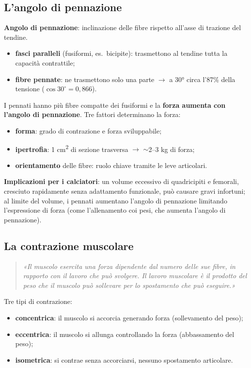\subsection{L'angolo di pennazione}
\textbf{Angolo di pennazione}: inclinazione delle fibre rispetto all'asse di trazione del tendine.
\begin{itemize}
  \item \textbf{fasci paralleli} (fusiformi, es.\ bicipite): trasmettono al tendine tutta la
    capacità contrattile;
  \item \textbf{fibre pennate}: ne trasmettono solo una parte $\rightarrow$ a 30° circa l'87\%
    della tensione ($\cos 30^\circ = 0{,}866$).
\end{itemize}
I pennati hanno più fibre compatte dei fusiformi e la \textbf{forza aumenta con l'angolo di
pennazione}. Tre fattori determinano la forza:
\begin{itemize}
  \item \textbf{forma}: grado di contrazione e forza sviluppabile;
  \item \textbf{ipertrofia}: 1 cm\textsuperscript{2} di sezione trasversa $\rightarrow$ $\sim$2--3
    kg di forza;
  \item \textbf{orientamento} delle fibre: ruolo chiave tramite le leve articolari.
\end{itemize}
\textbf{Implicazioni per i calciatori}: un volume eccessivo di quadricipiti e femorali, cresciuto
rapidamente senza adattamento funzionale, può causare gravi infortuni; al limite del volume, i
pennati aumentano l'angolo di pennazione limitando l'espressione di forza (come l'allenamento coi
pesi, che aumenta l'angolo di pennazione).

\subsection{La contrazione muscolare}
\begin{quote}
\textit{«Il muscolo esercita una forza dipendente dal numero delle sue fibre, in rapporto con il
lavoro che può svolgere. Il lavoro muscolare è il prodotto del peso che il muscolo può sollevare
per lo spostamento che può eseguire.»}
\end{quote}
Tre tipi di contrazione:
\begin{itemize}
  \item \textbf{concentrica}: il muscolo si accorcia generando forza (sollevamento del peso);
  \item \textbf{eccentrica}: il muscolo si allunga controllando la forza (abbassamento del peso);
  \item \textbf{isometrica}: si contrae senza accorciarsi, nessuno spostamento articolare.
\end{itemize}


